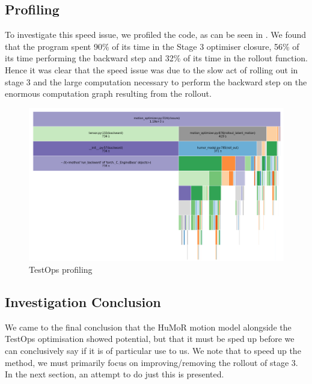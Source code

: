 \subsection{Profiling}
To investigate this speed issue, we profiled the code, as can be seen in . We found that the program spent 90\% of its time in the Stage 3 optimiser closure, 56\% of its time performing the backward step and 32\% of its time in the rollout function. Hence it was clear that the speed issue was due to the slow act of rolling out in stage 3 and the large computation necessary to perform the backward step on the enormous computation graph resulting from the rollout.

\begin{figure}[!ht]
    \centering
    \includegraphics[width=1\textwidth]{Figures/humor/profiling/profiling.png}
    \caption{TestOps profiling}
    \label{fig:humor_profiling}
\end{figure}

\subsection{Investigation Conclusion}
We came to the final conclusion that the HuMoR motion model alongside the TestOps optimisation showed potential, but that it must be sped up before we can conclusively say if it is of particular use to us. We note that to speed up the method, we must primarily focus on improving/removing the rollout of stage 3. In the next section, an attempt to do just this is presented.
